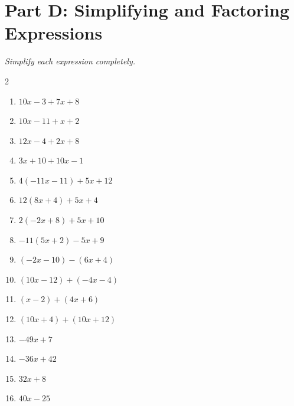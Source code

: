 \documentclass[11pt]{article}
\begin{document}
\section*{Part D: Simplifying and Factoring Expressions}
\noindent\textit{Simplify each expression completely.}
\begin{multicols}{2}
\begin{enumerate}
  \item $10x - 3 + 7x + 8$
  \vspace{1.3cm}
  \item $10x - 11 + x + 2$
  \vspace{1.3cm}
  \item $12x - 4 + 2x + 8$
  \vspace{1.3cm}
  \item $3x + 10 + 10x - 1$
  \vspace{1.3cm}
  \item $4(-11x - 11) + 5x + 12$
  \vspace{1.3cm}
  \item $12(8x + 4) + 5x + 4$
  \vspace{1.3cm}
  \item $2(-2x + 8) + 5x + 10$
  \vspace{1.3cm}
  \item $-11(5x + 2) - 5x + 9$
  \vspace{1.3cm}
  \item $(-2x - 10) - (6x + 4)$
  \vspace{1.3cm}
  \item $(10x - 12) + (-4x - 4)$
  \vspace{1.3cm}
  \item $(x - 2) + (4x + 6)$
  \vspace{1.3cm}
  \item $(10x + 4) + (10x + 12)$
  \vspace{1.3cm}
  \item $-49x + 7$
  \vspace{1.3cm}
  \item $-36x + 42$
  \vspace{1.3cm}
  \item $32x + 8$
  \vspace{1.3cm}
  \item $40x - 25$
  \vspace{1.3cm}
\end{enumerate}
\end{multicols}
\end{document}
